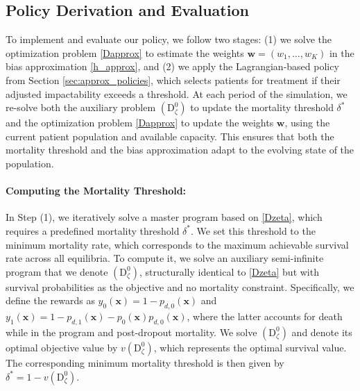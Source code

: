 \documentclass[12pt,a4paper]{article}
\newcommand{\bx}{\mathbf{x}}
\begin{document}
\subsection{Policy Derivation and Evaluation}

To implement and evaluate our policy, we follow two stages: (1) we solve the optimization problem \eqref{Dapprox} to estimate the weights \( \mathbf{w} = (w_1, \ldots, w_K) \) in the bias approximation \eqref{h_approx}, and (2) we apply the Lagrangian-based policy from Section \ref{sec:approx_policies}, which selects patients for treatment if their adjusted impactability exceeds a threshold. At each period of the simulation, we re-solve both the auxiliary problem $(\mbox{D}_{\zeta}^0)$ to update the mortality threshold $\delta^*$ and the optimization problem \eqref{Dapprox} to update the weights $\mathbf{w}$, using the current patient population and available capacity. This ensures that both the mortality threshold and the bias approximation adapt to the evolving state of the population.

\paragraph{\bf Computing the Mortality Threshold:} In Step (1), we iteratively solve a master program based on \eqref{Dzeta}, which requires a predefined mortality threshold \( \delta^* \). We set this threshold to the minimum mortality rate, which corresponds to the maximum achievable survival rate across all equilibria. To compute it, we solve an auxiliary semi-infinite program that we denote \( (\mbox{D}_{\zeta}^0) \), structurally identical to \eqref{Dzeta} but with survival probabilities as the objective and no mortality constraint. Specifically, we define the rewards as \( y_0(\bx) = 1 - p_{d,0}(\bx) \) and \( y_1(\bx) = 1 - p_{d,1}(\bx) - p_0(\bx) p_{d,0}(\bx) \), where the latter accounts for death while in the program and post-dropout mortality. 
We solve $(\mbox{D}_{\zeta}^0)$ and denote its optimal objective value by $v(\mbox{D}_{\zeta}^0)$, which represents the optimal survival value. The corresponding minimum mortality threshold is then given by $\delta^* = 1 - v(\mbox{D}_{\zeta}^0)$.
\end{document}
